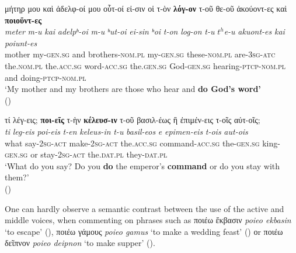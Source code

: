 \documentclass[output=paper,colorlinks,citecolor=brown]{langscibook}
\begin{document}
\ex\label{ex:vc:5b}

\glll μήτηρ μου καὶ ἀδελφ-οί μου οὗτ-οί εἰ-σιν οἱ τ-ὸν \textbf{λόγ-ον} τ-οῦ θε-οῦ ἀκούοντ-ες καὶ \textbf{ποιοῦντ-ες}\\
 \textit{meter} \textit{m-u} \textit{kai} \textit{adelpʰ-oi} \textit{m-u} \textit{ʰut-oi} \textit{ei-sin}
\textit{ʰoi} \textit{t-on} \textit{log-on} \textit{t-u} \textit{$t^h$e-u} \textit{akuont-es} \textit{kai} \textit{poiunt-es}\\
mother my-\textsc{gen.sg} and brothers-\textsc{nom.pl} my-\textsc{gen.sg} these-\textsc{nom.pl} are-\textsc{3sg-atc} the.\textsc{nom.pl} the.\textsc{acc.sg} word-\textsc{acc.sg} the.\textsc{gen.sg} God-\textsc{gen.sg} hearing-\textsc{ptcp-nom.pl}
and doing\textsc{-ptcp-nom.pl}\\
\glt `My mother and my brothers are those who hear and \textbf{do God's word'} \\
\hspace*{\fill}()

\ex\label{ex:vc:5c}

\glll τί λέγ-εις; \textbf{ποι-εῖς} τ-ὴν \textbf{κέλευσ-ιν} τ-οῦ βασιλ-έως ἢ ἐπιμέν-εις τ-οῖς αὐτ-οῖς;\\
 \textit{ti} \textit{leg-eis} \textit{poi-eis} \textit{t-en} \textit{keleus-in} \textit{t-u} \textit{basil-eos} \textit{e} \textit{epimen-eis} \textit{t-ois} \textit{aut-ois}\\
what say-\textsc{2sg-act} make-2\textsc{sg-act} the.\textsc{acc.sg} command-\textsc{acc.sg} the-\textsc{gen.sg} king-\textsc{gen.sg} or stay-\textsc{2sg-act} the.\textsc{dat.pl}
they-\textsc{dat.pl}\\
\glt `What do you say? Do you \textbf{do} the emperor's \textbf{command} or do you stay with them?' \\
\hspace*{\fill}()

\z

\z






One can hardly
observe a semantic contrast between the use of the active and middle voices, when
commenting on phrases such as ποιέω ἔκβασιν \emph{poieo ekbasin} `to escape'
(), ποιέω γάμους \emph{poieo gamus} `to make a
wedding feast' () οr ποιέω δεῖπνον \emph{poieo
  deipnon} `to make supper' ().
\end{document}
